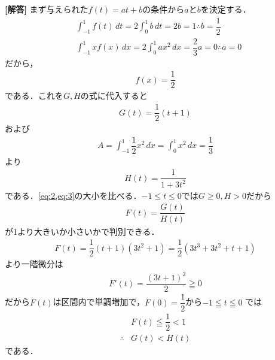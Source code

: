 \documentclass[../../main.tex]{subfiles}
\begin{document}
\begin{oframed}
  
\end{oframed}

{\bf [解答]}
まず与えられた$f(t)=at+b$の条件から$a$と$b$を決定する．
\begin{align}
  & \int_{-1}^1 f(t) \, dt = 2 \int_0^1 b \, dt = 2b = 1 \therefore b = \dfrac{1}{2} \\
  & \int_{-1}^1 x f(x) \, dx = 2 \int_0^1 a x^2 \, dx = \dfrac{2}{3} a = 0 \therefore a = 0
\end{align}
だから，
\begin{align}
  f(x) = \dfrac{1}{2} \label{eq:1}
\end{align}
である．これを$G,H$の式に代入すると
\begin{align}
  G(t) = \dfrac{1}{2} (t+1) \label{eq:2}
\end{align}
および
\begin{align}
  A = \int_{-1}^1 \dfrac{1}{2} x^2 \, dx = \int_0^1 x^2 \, dx = \dfrac{1}{3}
\end{align}
より
\begin{align}
  H(t) = \dfrac{1}{1 + 3t^2} \label{eq:3}
\end{align}
である．\cref{eq:2,eq:3}の大小を比べる．$-1\le t\le 0$では$G\ge 0, H>0$だから
\begin{align}
  F(t) = \dfrac{G(t)}{H(t)}
\end{align}
が1より大きいか小さいかで判別できる．
\begin{align}
  F(t) = \dfrac{1}{2}(t+1)(3t^2+1) = \dfrac{1}{2}(3t^3 + 3t^2 + t + 1)
\end{align}
より一階微分は
\begin{align}
  F'(t) = \dfrac{(3t+1)^2}{2} \geqq 0
\end{align}
だから$F(t)$は区間内で単調増加で，$F(0)=\dfrac{1}{2}$から$-1 \leqq t \leqq 0$ では
\begin{align}
  & F(t) \leqq \dfrac{1}{2} < 1 \\
  \therefore
  & G(t) < H(t)
\end{align}
である．
\end{document}
